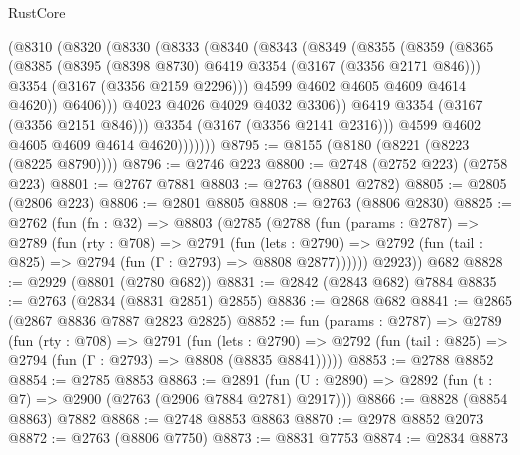 \begin{lexlean}{RustCore}
\begin{coremodule}
                (@8310
                  (@8320
                    (@8330
                      (@8333
                        (@8340
                          (@8343
                            (@8349
                              (@8355
                                (@8359
                                  (@8365
                                    (@8385
                                      (@8395 (@8398 @8730) @6419 @3354 (@3167 (@3356 @2171 @846)))
                                      @3354
                                      (@3167 (@3356 @2159 @2296)))
                                    @4599
                                    @4602
                                    @4605
                                    @4609
                                    @4614
                                    @4620))
                                @6406)))
                          @4023
                          @4026
                          @4029
                          @4032
                          @3306))
                      @6419
                      @3354
                      (@3167 (@3356 @2151 @846)))
                    @3354
                    (@3167 (@3356 @2141 @2316)))
                  @4599
                  @4602
                  @4605
                  @4609
                  @4614
                  @4620)))))))
@8795 := @8155 (@8180 (@8221 (@8223 (@8225 @8790))))
@8796 := @2746 @223
@8800 := @2748 (@2752 @223) (@2758 @223)
@8801 := @2767 @7881
@8803 := @2763 (@8801 @2782)
@8805 := @2805 (@2806 @223)
@8806 := @2801 @8805
@8808 := @2763 (@8806 @2830)
@8825 := @2762
    (fun (fn : @32) =>
    @8803
      (@2785
        (@2788
          (fun (params : @2787) =>
          @2789
            (fun (rty : @708) =>
            @2791
              (fun (lets : @2790) =>
              @2792 (fun (tail : @825) => @2794 (fun (Γ : @2793) => @8808 @2877))))))
        @2923))
    @682
@8828 := @2929 (@8801 (@2780 @682))
@8831 := @2842 (@2843 @682) @7884
@8835 := @2763 (@2834 (@8831 @2851) @2855)
@8836 := @2868 @682
@8841 := @2865 (@2867 @8836 @7887 @2823 @2825)
@8852 := fun (params : @2787) =>
  @2789
    (fun (rty : @708) =>
    @2791
      (fun (lets : @2790) =>
      @2792 (fun (tail : @825) => @2794 (fun (Γ : @2793) => @8808 (@8835 @8841)))))
@8853 := @2788 @8852
@8854 := @2785 @8853
@8863 := @2891 (fun (U : @2890) => @2892 (fun (t : @7) => @2900 (@2763 (@2906 @7884 @2781) @2917)))
@8866 := @8828 (@8854 @8863) @7882
@8868 := @2748 @8853 @8863
@8870 := @2978 @8852 @2073
@8872 := @2763 (@8806 @7750)
@8873 := @8831 @7753
@8874 := @2834 @8873

\end{coremodule}
\end{lexlean}
